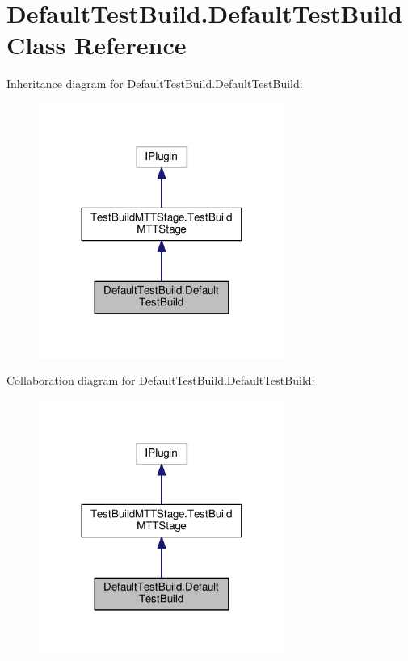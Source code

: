 \hypertarget{classDefaultTestBuild_1_1DefaultTestBuild}{\section{Default\-Test\-Build.\-Default\-Test\-Build Class Reference}
\label{classDefaultTestBuild_1_1DefaultTestBuild}
}


Inheritance diagram for Default\-Test\-Build.\-Default\-Test\-Build\-:
\nopagebreak
\begin{figure}[H]
\begin{center}
\leavevmode
\includegraphics[width=228pt]{classDefaultTestBuild_1_1DefaultTestBuild__inherit__graph}
\end{center}
\end{figure}


Collaboration diagram for Default\-Test\-Build.\-Default\-Test\-Build\-:
\nopagebreak
\begin{figure}[H]
\begin{center}
\leavevmode
\includegraphics[width=228pt]{classDefaultTestBuild_1_1DefaultTestBuild__coll__graph}
\end{center}
\end{figure}

